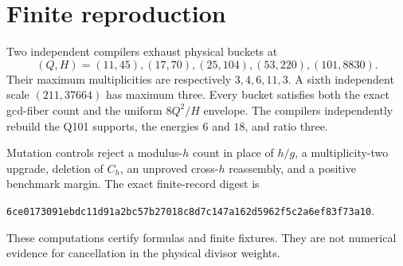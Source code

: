 \section{Finite reproduction}

Two independent compilers exhaust physical buckets at
\[
 (Q,H)=(11,45),(17,70),(25,104),(53,220),(101,8830).
\]
Their maximum multiplicities are respectively $3,4,6,11,3$.  A sixth independent
scale $(211,37664)$ has maximum three.  Every bucket satisfies both the exact
gcd-fiber count and the uniform $8Q^2/H$ envelope.  The compilers independently rebuild
the Q101 supports, the energies $6$ and $18$, and ratio three.

Mutation controls reject a modulus-$h$ count in place of $h/g$, a multiplicity-two
upgrade, deletion of $C_h$, an unproved cross-$h$ reassembly, and a positive benchmark
margin.  The exact finite-record digest is
\begin{center}
\texttt{6ce0173091ebdc11d91a2bc57b27018c8d7c147a162d5962f5c2a6ef83f73a10}.
\end{center}

These computations certify formulas and finite fixtures.  They are not numerical
evidence for cancellation in the physical divisor weights.
